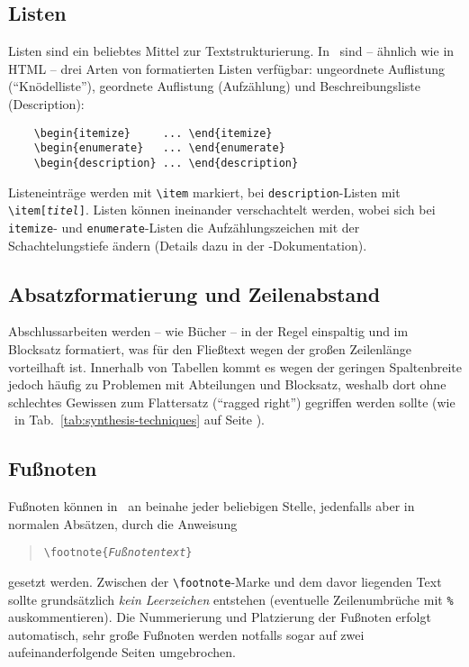 \subsection{Listen}

Listen sind ein beliebtes Mittel zur Textstrukturierung. In
\latex\ sind -- ähnlich wie in HTML -- drei Arten von formatierten
Listen verfügbar: ungeordnete Auflistung ("`Knödelliste"'),
geordnete Auflistung (Aufzählung) und Beschreibungsliste
(Description):
%
\begin{verbatim}
    \begin{itemize}     ... \end{itemize}
    \begin{enumerate}   ... \end{enumerate}
    \begin{description} ... \end{description}
\end{verbatim}
%
Listeneinträge werden mit \verb!\item! markiert, bei \texttt{description}-Listen mit \verb!\item[!\texttt{\em titel}\verb!]!. Listen
können ineinander verschachtelt werden, wobei sich bei \texttt{itemize}- und \texttt{enumerate}-Listen die Aufzählungszeichen mit
der Schachtelungstiefe ändern (Details dazu in der
\latex-Dokumentation).


\subsection{Absatzformatierung und Zeilenabstand}

Abschlussarbeiten werden -- wie Bücher -- in der Regel einspaltig und
im Blocksatz formatiert, was für den Fließtext wegen der großen
Zeilenlänge vorteilhaft ist. Innerhalb von Tabellen kommt es
wegen der geringen Spaltenbreite jedoch häufig zu Problemen mit
Abteilungen und Blocksatz, weshalb dort ohne schlechtes
Gewissen zum Flattersatz ("`ragged right"') gegriffen werden sollte (wie
\zB\ in Tab.~\ref{tab:synthesis-techniques} auf Seite
\pageref{tab:synthesis-techniques}).


\subsection{Fußnoten}
Fußnoten können in \latex\ an beinahe jeder beliebigen Stelle,
jedenfalls aber in normalen Absätzen, durch die Anweisung
%
\begin{quote}
\verb!\footnote{!\texttt{\em Fußnotentext}\verb!}!
\end{quote}
%
gesetzt werden. Zwischen der \verb!\footnote!-Marke und dem davor
liegenden Text sollte grundsätzlich \emph{kein Leerzeichen} entstehen (eventuelle
Zeilen\-um\-brüche mit \verb!%! auskommentieren).
Die Nummerierung und Platzierung der Fußnoten
erfolgt automatisch, sehr große Fußnoten werden notfalls sogar auf
zwei aufeinanderfolgende Seiten umgebrochen.


